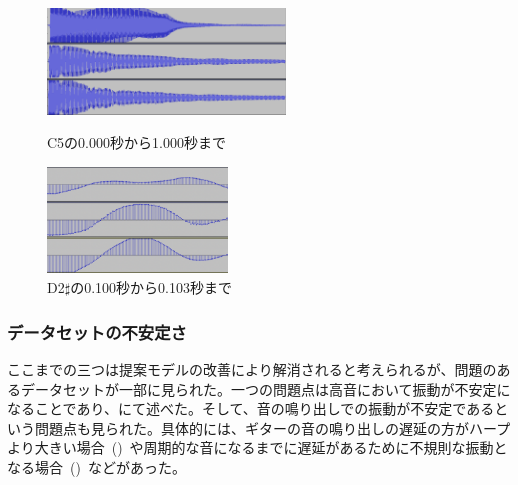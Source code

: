 \begin{figure}[b]
\centering
\begin{minipage}[b]{0.48\columnwidth}
\centering
\includegraphics[height=80pt]{figure/88_88/c5.png}
\caption[課題：音の大きさの維持]{C5の0.000秒から1.000秒まで}
\label{fig:88_88_amp}
\end{minipage}
\begin{minipage}[b]{0.48\columnwidth}
\centering
\includegraphics[height=80pt]{figure/88_88_det/d2s_0100_0103.png}
\caption[課題：音波の滑らかさの表現]{D2$\sharp$の0.100秒から0.103秒まで}
\label{fig:88_88_smooth}
\end{minipage}
\end{figure}

\subsubsection{データセットの不安定さ}

ここまでの三つは提案モデルの改善により解消されると考えられるが、問題のあるデータセットが一部に見られた。一つの問題点は高音において振動が不安定になることであり、にて述べた。そして、音の鳴り出しでの振動が不安定であるという問題点も見られた。具体的には、ギターの音の鳴り出しの遅延の方がハープより大きい場合~()~や周期的な音になるまでに遅延があるために不規則な振動となる場合~()~などがあった。

